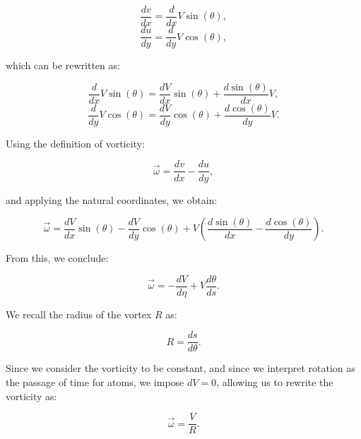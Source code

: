 \begin{equation*}
\frac{d v}{d x}=\frac{d}{d x} V \sin (\theta),
\end{equation*}
\begin{equation*}
\frac{d u}{d y}=\frac{d}{d y} V \cos (\theta),
\end{equation*}


which can be rewritten as:


\begin{equation*}
\frac{d}{d x} V \sin (\theta) = \frac{d V}{d x} \sin (\theta) + \frac{d \sin (\theta)}{d x} V,
\end{equation*}
\begin{equation*}
\frac{d}{d y} V \cos (\theta) = \frac{d V}{d y} \cos (\theta) + \frac{d \cos (\theta)}{d y} V.
\end{equation*}


Using the definition of vorticity:


\begin{equation*}
\vec{\omega} = \frac{d v}{d x} - \frac{d u}{d y},
\end{equation*}


and applying the natural coordinates, we obtain:


\begin{equation*}
\vec{\omega} = \frac{d V}{d x} \sin (\theta) - \frac{d V}{d y} \cos (\theta) + V\left(\frac{d \sin (\theta)}{d x} - \frac{d \cos (\theta)}{d y}\right).
\end{equation*}


From this, we conclude:


\begin{equation*}
\vec{\omega} = -\frac{d V}{d \eta} + V \frac{d \theta}{d s}.
\end{equation*}


We recall the radius of the vortex $R$ as:


\begin{equation*}
R = \frac{d s}{d \theta}.
\end{equation*}


Since we consider the vorticity to be constant, and since we interpret rotation as the passage of time for atoms, we impose $dV=0$, allowing us to rewrite the vorticity as:


\begin{equation*}
\vec{\omega} = \frac{V}{R}.
\end{equation*}